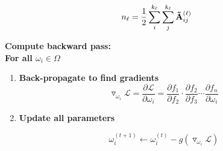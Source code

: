 \documentclass[a4paper,12pt]{article}
\begin{document}
\begin{itemize}
\begin{enumerate}
{{\begin{enumerate}
{					\[n_\ell = \frac{1}{2}\sum_i^{k_\ell} \sum_j^{k_\ell} {\bf \tilde A}^{(\ell)}_{ij}\]
					}
			\end{enumerate}
			}
			\item[2.2.3]{\textbf{Compute backward pass:}} \\
			\textbf{For all $\omega_i \in \Omega$} 
			\begin{enumerate}
				\item[]{\textbf{Back-propagate to find gradients} 
					\[\triangledown_{\omega_i} \mathcal{L} =  \frac{\partial\mathcal{L}}{\partial {\omega_i}} = \frac{\partial f_1}{\partial f_2}\cdot\frac{\partial f_2}{\partial f_3}\cdots\frac{\partial f_n}{\partial \omega_i} \]}
				
				\item[]{\textbf{Update all parameters}
					
					\[\omega_i^{(t+1)} \leftarrow \omega_i^{(t)} - g\left(\triangledown_{\omega_i}\mathcal{L}\right) \]
				
				}  
			\end{enumerate}
			
		}
		\end{enumerate} 
	
	\end{itemize}
	
	
\end{document}
